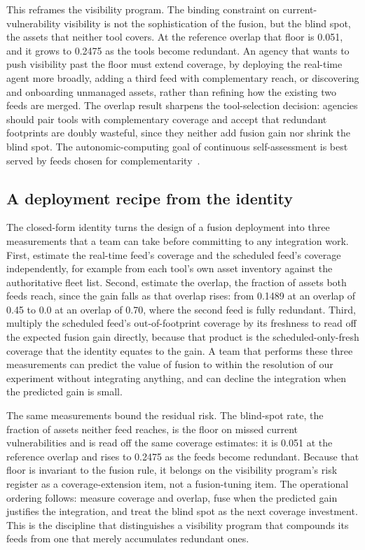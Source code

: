 \documentclass[journal]{IEEEtran}
\begin{document}
This reframes the visibility program. The binding constraint on current-vulnerability visibility is
not the sophistication of the fusion, but the blind spot, the assets that neither tool covers. At
the reference overlap that floor is 0.051, and it grows to 0.2475 as the tools become redundant. An
agency that wants to push visibility past the floor must extend coverage, by deploying the
real-time agent more broadly, adding a third feed with complementary reach, or discovering and
onboarding unmanaged assets, rather than refining how the existing two feeds are merged. The
overlap result sharpens the tool-selection decision: agencies should pair tools with complementary
coverage and accept that redundant footprints are doubly wasteful, since they neither add fusion
gain nor shrink the blind spot. The autonomic-computing goal of continuous self-assessment is best
served by feeds chosen for complementarity~\cite{kephart2003vision}.

\subsection{A deployment recipe from the identity}
The closed-form identity turns the design of a fusion deployment into three measurements that a
team can take before committing to any integration work. First, estimate the real-time feed's
coverage and the scheduled feed's coverage independently, for example from each tool's own asset
inventory against the authoritative fleet list. Second, estimate the overlap, the fraction of
assets both feeds reach, since the gain falls as that overlap rises: from 0.1489 at an overlap of
0.45 to 0.0 at an overlap of 0.70, where the second feed is fully redundant. Third, multiply the
scheduled feed's out-of-footprint coverage by its freshness to read off the expected fusion gain
directly, because that product is the scheduled-only-fresh coverage that the identity equates to
the gain. A team that performs these three measurements can predict the value of fusion to within
the resolution of our experiment without integrating anything, and can decline the integration when
the predicted gain is small.

The same measurements bound the residual risk. The blind-spot rate, the fraction of assets neither
feed reaches, is the floor on missed current vulnerabilities and is read off the same coverage
estimates: it is 0.051 at the reference overlap and rises to 0.2475 as the feeds become redundant.
Because that floor is invariant to the fusion rule, it belongs on the visibility program's risk
register as a coverage-extension item, not a fusion-tuning item. The operational ordering follows:
measure coverage and overlap, fuse when the predicted gain justifies the integration, and treat the
blind spot as the next coverage investment. This is the discipline that distinguishes a visibility
program that compounds its feeds from one that merely accumulates redundant ones.
\end{document}
